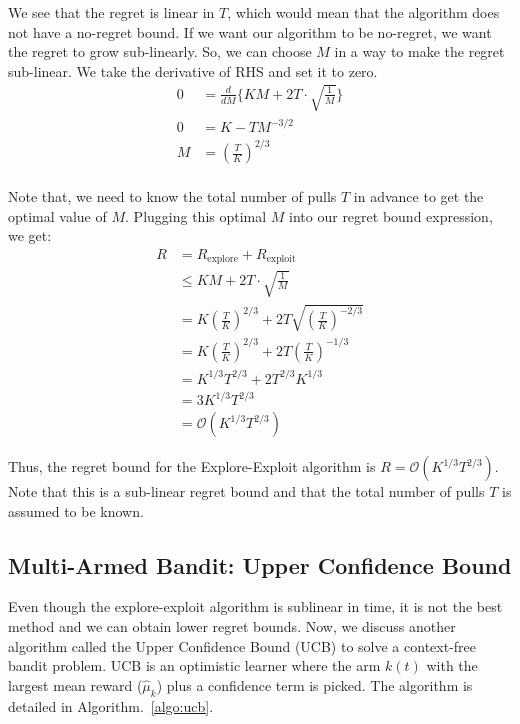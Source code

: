 \documentclass[11pt]{article}
\begin{document}
We see that the regret is linear in $T$, which would mean that the algorithm does not have a no-regret bound. If we want our
algorithm to be no-regret, we want the regret to grow sub-linearly. So, we can choose
$M$ in a way to make the regret sub-linear. We take the derivative of RHS and set it to zero.
\begin{align*}
    0 &= \frac{d}{dM} \Big\{ KM + 2T \cdot \sqrt{\frac{1}{M}} \Big\}\\
    0 &= K - TM^{-3/2}\\
    M &= \left( \frac{T}{K} \right)^{2/3}\\
\end{align*}

Note that, we need to know the total number of pulls $T$ in advance to get the optimal value of $M$. Plugging this optimal $M$ into our regret bound expression, we get:
\begin{align*}
    R &= R_{\text{explore}} + R_{\text{exploit}}\\
    &\leq KM + 2T \cdot \sqrt{\frac{1}{M}}\\ 
    &= K \left( \frac{T}{K} \right)^{2/3} + 2T \sqrt{\left( \frac{T}{K}\right)^{-2/3}}\\
    &= K \left( \frac{T}{K} \right)^{2/3} + 2T \left( \frac{T}{K}\right)^{-1/3}\\
    &= K^{1/3}T^{2/3} + 2T^{2/3}K^{1/3}\\
    &= 3K^{1/3}T^{2/3}\\
    &= \mathcal{O}(K^{1/3}T^{2/3})
\end{align*}

Thus, the regret bound for the Explore-Exploit algorithm is $R = \mathcal{O}(K^{1/3}T^{2/3})$. Note that this
is a sub-linear regret bound and that the total number of pulls $T$ is assumed to be known.

\subsection{Multi-Armed Bandit: Upper Confidence Bound}

Even though the explore-exploit algorithm is sublinear in time, it is not the best method and we can obtain lower regret bounds. Now, we discuss another algorithm called the Upper Confidence Bound (UCB) to solve a context-free bandit problem. UCB is an optimistic learner where the arm $k(t)$ with the largest mean reward ($\hat{\mu}_{k}$) plus a confidence term is picked. The algorithm is detailed in Algorithm.~\ref{algo:ucb}.
\end{document}
